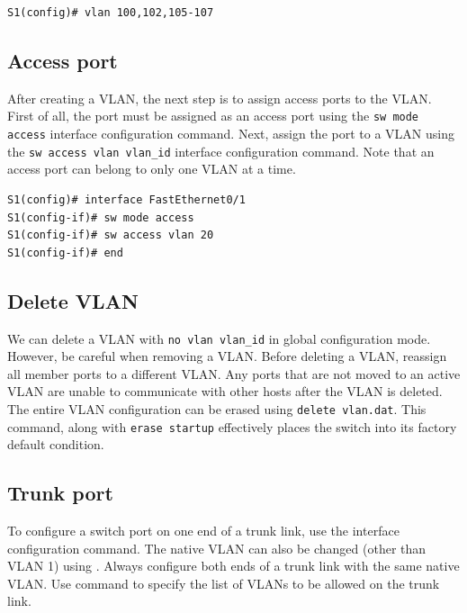 \begin{verbatim}
S1(config)# vlan 100,102,105-107
\end{verbatim}

\subsection{Access port}

After creating a VLAN, the next step is to assign access ports to the VLAN. First of all, the port must be assigned as an access port using the \verb|sw mode access| interface configuration command. Next, assign the port to a VLAN using the \verb|sw access vlan vlan_id| interface configuration command. Note that an access port can belong to only one VLAN at a time.

\begin{verbatim}
S1(config)# interface FastEthernet0/1
S1(config-if)# sw mode access
S1(config-if)# sw access vlan 20
S1(config-if)# end
\end{verbatim}

\subsection{Delete VLAN}

We can delete a VLAN with \verb|no vlan vlan_id| in global configuration mode. However, be careful when removing a VLAN. Before deleting a VLAN, reassign all member ports to a different VLAN. Any ports that are not moved to an active VLAN are unable to communicate with other hosts after the VLAN is deleted. \\

The entire VLAN configuration can be erased using \verb|delete vlan.dat|. This command, along with \verb|erase startup| effectively places the switch into its factory default condition.

\subsection{Trunk port}

To configure a switch port on one end of a trunk link, use the  interface configuration command. The native VLAN can also be changed (other than VLAN 1) using . Always configure both ends of a trunk link with the same native VLAN. Use  command to specify the list of VLANs to be allowed on the trunk link.\\


